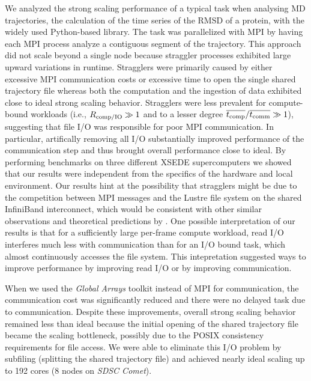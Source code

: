 \label{sec:conclusions}

We analyzed the strong scaling performance of a typical task when analysing MD trajectories, the calculation of the time series of the RMSD of a protein, with the widely used Python-based  library.
The task was parallelized with MPI by having each MPI process analyze a contiguous segment of the trajectory.
This approach did not scale beyond a single node because straggler processes exhibited large upward variations in runtime.
Stragglers were primarily caused by either excessive MPI communication costs or excessive time to open the single shared trajectory file whereas both the computation and the ingestion of data exhibited close to ideal strong scaling behavior.
Stragglers were less prevalent for compute-bound workloads (i.e., $R_{\text{comp/IO}} \gg 1$ and to a lesser degree $\overline{{t}_{\text{comp}}}/\overline{t_{\text{comm}}} \gg 1$), suggesting that file I/O was responsible for poor MPI communication.
In particular, artifically removing all I/O substantially improved performance of the communication step and thus brought overall performance close to ideal.
By performing benchmarks on three different XSEDE supercomputers we showed that our results were independent from the specifics of the hardware and local environment.
Our results hint at the possibility that stragglers might be due to the competition between MPI messages and the Lustre file system on the shared InfiniBand interconnect, which would be consistent with other similar observations \cite{VMD2013} and theoretical predictions by \citet{Brown:2018ab}.
One possible interpretation of our results is that for a sufficiently large per-frame compute workload, read I/O interferes much less with communication than for an I/O bound task, which almost continuously accesses the file system.
This intepretation suggested ways to improve performance by improving read I/O or by improving communication.

When we used the {\em Global Arrays\/} toolkit instead of MPI for communication, the communication cost was significantly reduced and there were no delayed task due to communication.
Despite these improvements, overall strong scaling behavior remained less than ideal because the initial opening of the shared trajectory file became the scaling bottleneck, possibly due to the POSIX consistency requirements for file access.
We were able to eliminate this I/O problem by subfiling (splitting the shared trajectory file) and achieved nearly ideal scaling up to 192 cores (8 nodes on \emph{SDSC Comet}).

